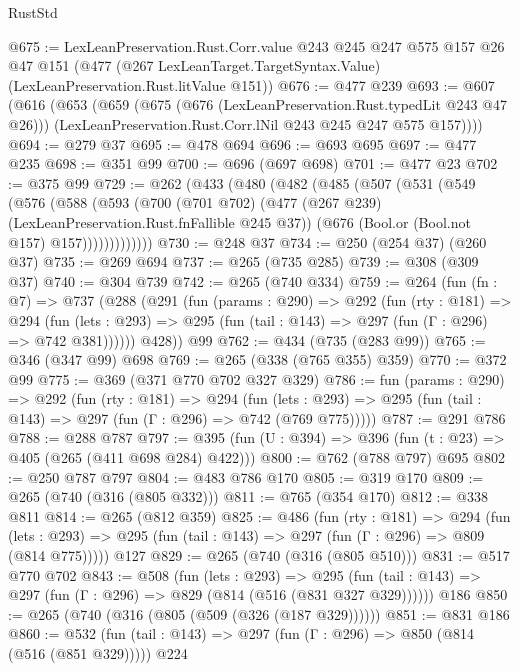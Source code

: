\begin{lexlean}{RustStd}
\begin{coremodule}
@675 := LexLeanPreservation.Rust.Corr.value
    @243
    @245
    @247
    @575
    @157
    @26
    @47
    @151
    (@477 (@267 LexLeanTarget.TargetSyntax.Value) (LexLeanPreservation.Rust.litValue @151))
@676 := @477 @239
@693 := @607
    (@616
      (@653
        (@659
          (@675 (@676 (LexLeanPreservation.Rust.typedLit @243 @47 @26)))
          (LexLeanPreservation.Rust.Corr.lNil @243 @245 @247 @575 @157))))
@694 := @279 @37
@695 := @478 @694
@696 := @693 @695
@697 := @477 @235
@698 := @351 @99
@700 := @696 (@697 @698)
@701 := @477 @23
@702 := @375 @99
@729 := @262
    (@433
      (@480
        (@482
          (@485
            (@507
              (@531
                (@549
                  (@576
                    (@588
                      (@593
                        (@700
                          (@701 @702)
                          (@477 (@267 @239) (LexLeanPreservation.Rust.fnFallible @245 @37))
                          (@676 (Bool.or (Bool.not @157) @157)))))))))))))
@730 := @248 @37
@734 := @250 (@254 @37) (@260 @37)
@735 := @269 @694
@737 := @265 (@735 @285)
@739 := @308 (@309 @37)
@740 := @304 @739
@742 := @265 (@740 @334)
@759 := @264
    (fun (fn : @7) =>
    @737
      (@288
        (@291
          (fun (params : @290) =>
          @292
            (fun (rty : @181) =>
            @294
              (fun (lets : @293) =>
              @295 (fun (tail : @143) => @297 (fun (Γ : @296) => @742 @381))))))
        @428))
    @99
@762 := @434 (@735 (@283 @99))
@765 := @346 (@347 @99) @698
@769 := @265 (@338 (@765 @355) @359)
@770 := @372 @99
@775 := @369 (@371 @770 @702 @327 @329)
@786 := fun (params : @290) =>
  @292
    (fun (rty : @181) =>
    @294
      (fun (lets : @293) => @295 (fun (tail : @143) => @297 (fun (Γ : @296) => @742 (@769 @775)))))
@787 := @291 @786
@788 := @288 @787
@797 := @395 (fun (U : @394) => @396 (fun (t : @23) => @405 (@265 (@411 @698 @284) @422)))
@800 := @762 (@788 @797) @695
@802 := @250 @787 @797
@804 := @483 @786 @170
@805 := @319 @170
@809 := @265 (@740 (@316 (@805 @332)))
@811 := @765 (@354 @170)
@812 := @338 @811
@814 := @265 (@812 @359)
@825 := @486
    (fun (rty : @181) =>
    @294
      (fun (lets : @293) => @295 (fun (tail : @143) => @297 (fun (Γ : @296) => @809 (@814 @775)))))
    @127
@829 := @265 (@740 (@316 (@805 @510)))
@831 := @517 @770 @702
@843 := @508
    (fun (lets : @293) =>
    @295 (fun (tail : @143) => @297 (fun (Γ : @296) => @829 (@814 (@516 (@831 @327 @329))))))
    @186
@850 := @265 (@740 (@316 (@805 (@509 (@326 (@187 @329))))))
@851 := @831 @186
@860 := @532 (fun (tail : @143) => @297 (fun (Γ : @296) => @850 (@814 (@516 (@851 @329))))) @224

\end{coremodule}
\end{lexlean}
